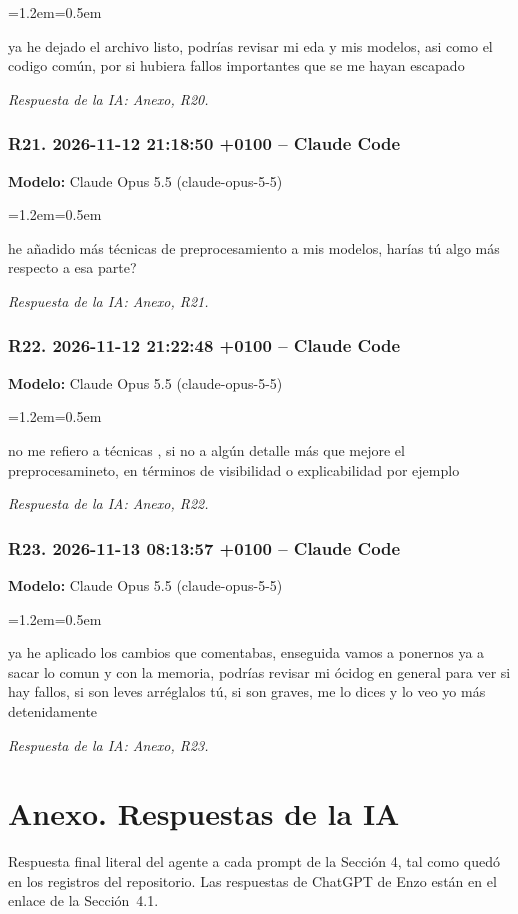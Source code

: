 \documentclass[11pt,a4paper]{article}
\newenvironment{prompt}
  {\par\smallskip\begin{list}{}{\leftmargin=1.2em\rightmargin=0.5em}\item\relax\small\color{black!80}}
  {\end{list}\smallskip}
\begin{document}
\begin{prompt}
ya he dejado el archivo listo, podrías revisar mi eda y mis modelos, asi como el codigo común, por si hubiera fallos importantes que se me hayan escapado
\end{prompt}

\textit{Respuesta de la IA: Anexo, R20.}

\subsubsection*{R21. 2026-11-12 21:18:50 +0100 -- Claude Code}
\textbf{Modelo:} Claude Opus 5.5 (claude-opus-5-5)

\begin{prompt}
he añadido más técnicas de preprocesamiento a mis modelos, harías tú algo más respecto a esa parte?
\end{prompt}

\textit{Respuesta de la IA: Anexo, R21.}

\subsubsection*{R22. 2026-11-12 21:22:48 +0100 -- Claude Code}
\textbf{Modelo:} Claude Opus 5.5 (claude-opus-5-5)

\begin{prompt}
no me refiero a técnicas , si no a algún detalle más que mejore el preprocesamineto, en términos de visibilidad o explicabilidad por ejemplo
\end{prompt}

\textit{Respuesta de la IA: Anexo, R22.}

\subsubsection*{R23. 2026-11-13 08:13:57 +0100 -- Claude Code}
\textbf{Modelo:} Claude Opus 5.5 (claude-opus-5-5)

\begin{prompt}
ya he aplicado los cambios que comentabas, enseguida vamos a ponernos ya a sacar lo comun y con la memoria, podrías revisar mi ócidog en general para ver si hay fallos, si son leves arréglalos tú, si son graves, me lo dices y lo veo yo más detenidamente
\end{prompt}

\textit{Respuesta de la IA: Anexo, R23.}


\clearpage
\section*{Anexo. Respuestas de la IA}
Respuesta final literal del agente a cada prompt de la Sección 4, tal como quedó en los registros del
repositorio. Las respuestas de ChatGPT de Enzo están en el enlace de la Sección~4.1.
\end{document}
